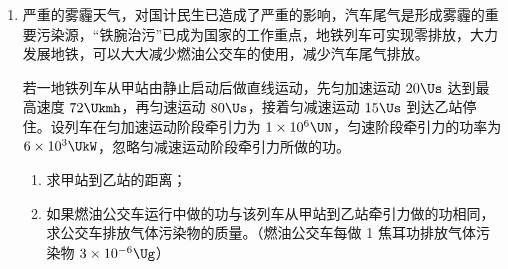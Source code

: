 \documentclass[\gkver]{gaokaozhenti}
\begin{document}
\begin{enumerate}
{	（2）①由于电池的电动势约 $6\UV$，电池内阻和待测电阻阻值都为数十欧，可知电路中的电流几十毫安，故电流表应选用 $A_{2}$；为了电路能正常工作、方便调节，多测几组数据，滑动变阻器应选用 $R_{2}$。②由图 1 电路可知，电压表测量的是路端电压，电流表测电路的总电流，故图 2 中，图线斜率绝对值即为电源的内阻，有：$r=|k|=\frac{5.5-4.0}{(80-20)\times10^{-3}}\UO=25\UO$。③当改接电路后，图线的斜率为电源的内阻与电阻 $R_{x}$ 之和，因此有：$r+R_{x}=|k'|=\frac{U_{0}-0}{I_{0}-0}$，故 $R_{x}=\frac{U_{0}}{I_{0}}-r$。④若电表为理想电表，$R_{x}$ 接在 B、C 之间与接在 A、B 之间，电路的总电阻可变范围不变，因此电流表的示数变化范围相同；$R_{x}$ 接在 B、C 之间时，电压表测滑动变阻器两端电压，而 $R_{x}$ 接在 A、B 之间时，电压表测滑动变阻器与 $R_{x}$ 两端电压的和，当滑动变阻器阻值为某一值时，电路的电流相同，而电压表的读数不同，故电压表示数变化范围不同。
}

\item
严重的雾霾天气，对国计民生已造成了严重的影响，汽车尾气是形成雾霾的重要污染源，“铁腕治污”已成为国家的工作重点，地铁列车可实现零排放，大力发展地铁，可以大大减少燃油公交车的使用，减少汽车尾气排放。

若一地铁列车从甲站由静止启动后做直线运动，先匀加速运动 $20\Us$ 达到最高速度 $72\Ukmh$，再匀速运动 $80\Us$，接着匀减速运动 $15\Us$ 到达乙站停住。设列车在匀加速运动阶段牵引力为 $1\times10^{6}\UN$，匀速阶段牵引力的功率为 $6\times10^{3}\UkW$，忽略匀减速运动阶段牵引力所做的功。


\begin{enumerate}
	\item
	求甲站到乙站的距离；
	\item
	如果燃油公交车运行中做的功与该列车从甲站到乙站牵引力做的功相同，求公交车排放气体污染物的质量。（燃油公交车每做 1 焦耳功排放气体污染物 $3\times10^{-6}\Ug$）
\end{enumerate}

\end{enumerate}
\end{document}
